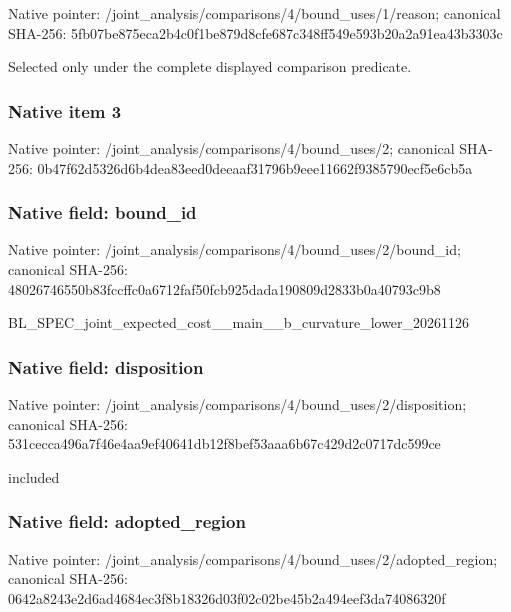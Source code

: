 \documentclass[10pt,a4paper]{article}
\begin{document}
Native pointer: /joint\_analysis/comparis\allowbreak{}ons/4/bound\_uses/1/reaso\allowbreak{}n; canonical SHA-256: 5fb07be875eca2b4c0f1be87\allowbreak{}9d8cfe687c348ff549e593b2\allowbreak{}0a2a91ea43b3303c


Selected only under the complete displayed comparison predicate.


\subsubsection{Native item 3}


Native pointer: /joint\_analysis/comparis\allowbreak{}ons/4/bound\_uses/2; canonical SHA-256: 0b47f62d5326d6b4dea83eed\allowbreak{}0deeaaf31796b9eee11662f9\allowbreak{}385790ecf5e6cb5a



\subsubsection{Native field: bound\_id}


Native pointer: /joint\_analysis/comparis\allowbreak{}ons/4/bound\_uses/2/bound\allowbreak{}\_id; canonical SHA-256: 48026746550b83fccffc0a67\allowbreak{}12faf50fcb925dada190809d\allowbreak{}2833b0a40793c9b8


BL\_SPEC\_joint\_expected\_c\allowbreak{}ost\_\_main\_\_b\_curvature\_l\allowbreak{}ower\_20261126


\subsubsection{Native field: disposition}


Native pointer: /joint\_analysis/comparis\allowbreak{}ons/4/bound\_uses/2/dispo\allowbreak{}sition; canonical SHA-256: 531cecca496a7f46e4aa9ef4\allowbreak{}0641db12f8bef53aaa6b67c4\allowbreak{}29d2c0717dc599ce


included


\subsubsection{Native field: adopted\_region}


Native pointer: /joint\_analysis/comparis\allowbreak{}ons/4/bound\_uses/2/adopt\allowbreak{}ed\_region; canonical SHA-256: 0642a8243e2d6ad4684ec3f8\allowbreak{}b18326d03f02c02be45b2a49\allowbreak{}4eef3da74086320f
\end{document}
